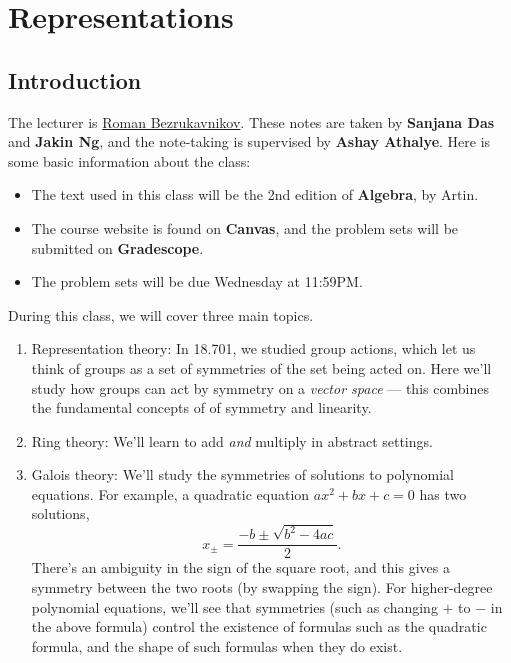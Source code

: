 

\section{Representations}
\subsection{Introduction}
The lecturer is \href{https://math.mit.edu/~bezrukav/}{Roman Bezrukavnikov}. These notes are taken by \textbf{Sanjana Das} and \textbf{Jakin Ng}, and the note-taking is supervised by \textbf{Ashay Athalye}. Here is some basic information about the class:
\begin{itemize}
    \item The text used in this class will be the 2nd edition of \textbf{Algebra}, by Artin. 

    \item The course website is found on \textbf{Canvas}, and the problem sets will be submitted on \textbf{Gradescope}. 
    
    \item The problem sets will be due Wednesday at 11:59PM.
\end{itemize}

During this class, we will cover three main topics. 
\begin{enumerate}
    \item Representation theory: In 18.701, we studied group actions, which let us think of groups as a set of symmetries of the set being acted on. Here we'll study how groups can act by symmetry on a \emph{vector space} --- this combines the fundamental concepts of of symmetry and linearity. 
    \item Ring theory: We'll learn to add \emph{and} multiply in abstract settings.
    \item Galois theory: We'll study the symmetries of solutions to polynomial equations. For example, a quadratic equation $ax^2 + bx + c = 0$ has two solutions, \[x_{\pm} = \frac{-b \pm \sqrt{b^2 - 4ac}}{2}.\] There's an ambiguity in the sign of the square root, and this gives a symmetry between the two roots (by swapping the sign). For higher-degree polynomial equations, we'll see that symmetries (such as changing $+$ to $-$ in the above formula) control the existence of formulas such as the quadratic formula, and the shape of such formulas when they do exist. 
\end{enumerate}

